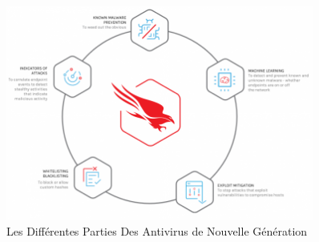 \begin{figure}[h]
	\begin{center}
	\includegraphics[width=0.9\textwidth]{PhotoMemoire/newgenerationanti.png}
	\caption{Les Différentes Parties Des Antivirus de Nouvelle Génération\cite{15} }
	\end{center}
\end{figure}

